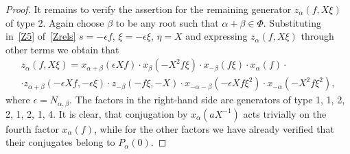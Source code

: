 \documentclass[oneside, 8pt]{amsart}
\newtheorem{corollary}{Corollary}
\theoremstyle{remark}
\theoremstyle{definition}
\numberwithin{equation}{section}
\begin{document}
\begin{proof}
It remains to verify the assertion for the remaining generator $z_\alpha(f, X\xi)$ of type 2.
Again choose $\beta$ to be any root such that $\alpha+\beta \in \Phi$.
Substituting in~\eqref{Z5} of~\cref{Zrels} $s = -\epsilon f$, $\xi = -\epsilon \xi$, $\eta=X$ and expressing $z_\alpha(f, X\xi)$ through other terms we obtain that
\begin{multline} \nonumber z_\alpha(f, X\xi) = x_{\alpha+\beta}(\epsilon Xf) \cdot x_{\beta}(-X^2 f \xi) \cdot x_{-\beta}(f \xi) \cdot x_\alpha(f) \cdot \\ 
 \cdot z_{\alpha+\beta}(-\epsilon X f, -\epsilon \xi) \cdot z_{-\beta}(-f\xi, -X) \cdot x_{-\alpha-\beta}(-\epsilon X f \xi^2) \cdot x_{-\alpha}(-X^2 f\xi^2), \end{multline}
where $\epsilon = N_{\alpha,\beta}$.  
The factors in the right-hand side are generators of type 1, 1, 2, 2, 1, 2, 1, 4. 
It is clear, that conjugation by $x_{\alpha}(aX^{-1})$ acts trivially on the fourth factor $x_\alpha(f)$, 
while for the other factors we have already verified that their conjugates belong to $P_{\alpha}(0)$. \end{proof}

\begin{comment}
\begin{corollary} Suppose $g$ is an element of $P_\alpha(0) \cap K(A[X], M[X])$. Then $ev^*_{X=0}(S_\alpha(a, g))$ lies in the subgroup $U(Z_+(\alpha), M)$. \end{corollary}
\begin{proof}
 By~\cref{Kgen-strong} and~\cref{P0_normal} $g$ can be expressed as a product of elements 
 $z_\beta(Xf, \xi)$, $\beta\in\Phi\setminus\{\pm \alpha\}$, $c_\gamma(f, X\xi)$ for some $\gamma$ orthogonal to $\alpha$, $x_{-\alpha}(X^2f)$, $x_{\alpha}(f)$.
 
 It remains to notice that the only factors in the right-hand sides of in~\eqref{eq:Zconj1}--\eqref{eq:Zconj3} which do not vanish after evaluation at $X=0$
  are those of the form $x_\beta(m)$ for some $\beta \in Z_+(\alpha)$.
\end{proof}
\end{comment}
\end{document}
